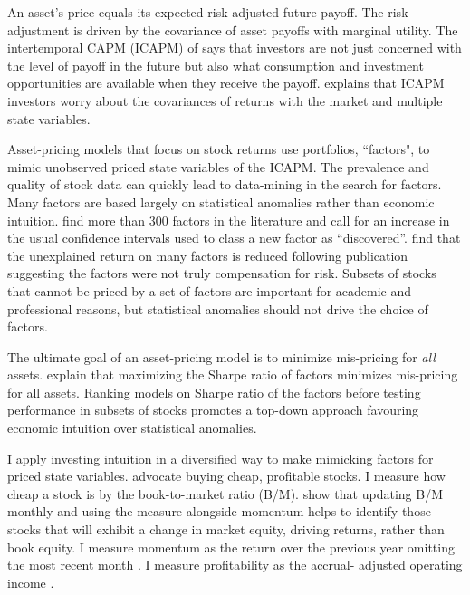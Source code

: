 

An asset’s price equals its expected risk adjusted future payoff. The risk
adjustment is driven by the covariance of asset payoffs with marginal utility.
The intertemporal CAPM (ICAPM) of \textcite{merton1973intertemporal} says that
investors are not just concerned with the level of payoff in the future but
also what consumption and investment opportunities are available when they
receive the payoff. \textcite{fama1996multifactor} explains that ICAPM
investors worry about the covariances of returns with the market and multiple
state variables.

Asset-pricing models that focus on stock returns use portfolios, ``factors", to
mimic unobserved priced state variables of the ICAPM. The prevalence and
quality of stock data can quickly lead to data-mining in the search for
factors. Many factors are based largely on statistical anomalies rather than
economic intuition. \textcite{harvey2016and} find more than 300 factors in the
literature and call for an increase in the usual confidence intervals used to
class a new factor as ``discovered”. \textcite{mclean2016does} find that the
unexplained return on many factors is reduced following publication suggesting
the factors were not truly compensation for risk. Subsets of stocks that cannot
be priced by a set of factors are important for academic and professional
reasons, but statistical anomalies should not drive the choice of factors.

The ultimate goal of an asset-pricing model is to minimize mis-pricing for
\emph{all} assets. \textcite{barillas2016alpha} explain that maximizing the
Sharpe ratio of factors minimizes mis-pricing for all assets. Ranking models on
Sharpe ratio of the factors before testing performance in subsets of stocks
promotes a top-down approach favouring economic intuition over statistical
anomalies.

I apply investing intuition in a diversified way to make mimicking factors for
priced state variables. \textcite{graham1934security} advocate buying cheap,
profitable stocks. I measure how cheap a stock is by the book-to-market ratio
(B/M). \textcite{kok2017facts, asness2013devil} show that updating B/M monthly
and using the measure alongside momentum helps to identify those stocks that
will exhibit a change in market equity, driving returns, rather than book
equity. I measure momentum as the return over the previous year omitting the
most recent month \parencite{fama2016dissecting}. I measure profitability as
the accrual- adjusted operating income \parencite{ball2016accruals}.

